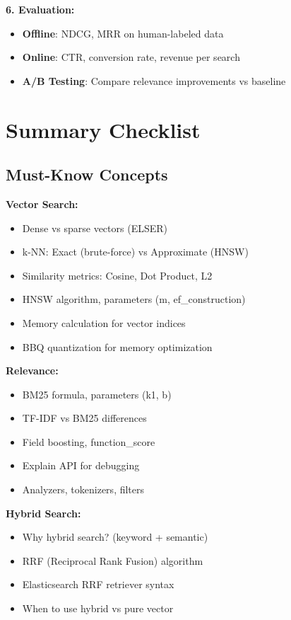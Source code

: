 \documentclass[10pt]{article}
\begin{document}
\textbf{6. Evaluation:}
\begin{itemize}
\item \textbf{Offline}: NDCG, MRR on human-labeled data
\item \textbf{Online}: CTR, conversion rate, revenue per search
\item \textbf{A/B Testing}: Compare relevance improvements vs baseline
\end{itemize}

\section{Summary Checklist}

\subsection{Must-Know Concepts}

\textbf{Vector Search:}
\begin{itemize}[label=$\square$]
\item Dense vs sparse vectors (ELSER)
\item k-NN: Exact (brute-force) vs Approximate (HNSW)
\item Similarity metrics: Cosine, Dot Product, L2
\item HNSW algorithm, parameters (m, ef\_construction)
\item Memory calculation for vector indices
\item BBQ quantization for memory optimization
\end{itemize}

\textbf{Relevance:}
\begin{itemize}[label=$\square$]
\item BM25 formula, parameters (k1, b)
\item TF-IDF vs BM25 differences
\item Field boosting, function\_score
\item Explain API for debugging
\item Analyzers, tokenizers, filters
\end{itemize}

\textbf{Hybrid Search:}
\begin{itemize}[label=$\square$]
\item Why hybrid search? (keyword + semantic)
\item RRF (Reciprocal Rank Fusion) algorithm
\item Elasticsearch RRF retriever syntax
\item When to use hybrid vs pure vector
\end{itemize}
\end{document}
